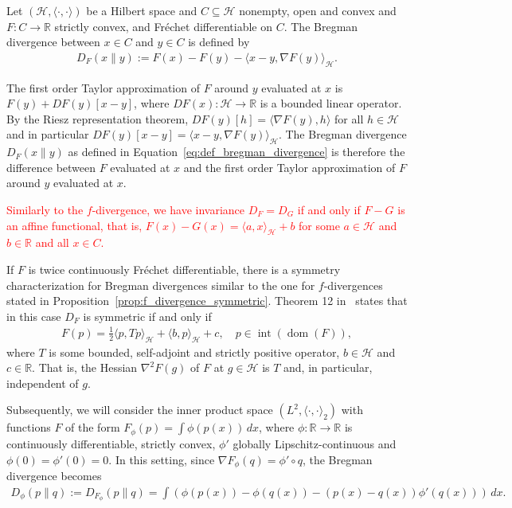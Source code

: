 \begin{Def}
    Let $(\mathcal{H},\langle\cdot,\cdot\rangle)$ be a Hilbert space and $C\subseteq\mathcal{H}$ nonempty, open and convex and $F:C\to\mathbb{R}$ strictly convex, and Fréchet differentiable on $C$. The Bregman divergence between $x\in C$ and $y\in C$ is defined by
    \begin{align}\label{eq:def_bregman_divergence}
        D_F(x\|y):=F(x)-F(y)-\langle x-y,\nabla F(y)\rangle_{\mathcal{H}}.
    \end{align}
\end{Def}

The first order Taylor approximation of $F$ around $y$ evaluated at $x$ is $F(y)+DF(y)[x-y]$, where $DF(x):\mathcal{H}\to\mathbb{R}$ is a bounded linear operator. By the Riesz representation theorem, $DF(y)[h]=\langle\nabla F(y),h\rangle$ for all $h\in\mathcal{H}$ and in particular $DF(y)[x-y]=\langle x-y,\nabla F(y)\rangle_{\mathcal{H}}$. The Bregman divergence $D_F(x\|y)$ as defined in Equation~\eqref{eq:def_bregman_divergence} is therefore the difference between $F$ evaluated at $x$ and the first order Taylor approximation of $F$ around $y$ evaluated at $x$.


\textcolor{red}{Similarly to the $f$-divergence, we have invariance $D_F=D_{G}$ if and only if $F-G$ is an affine functional, that is, $F(x)-G(x)=\langle a,x\rangle_{\mathcal{H}}+b$ for some $a\in\mathcal{H}$ and $b\in\mathbb{R}$ and all $x\in C$.}

If $F$ is twice continuously Fréchet differentiable, there is a symmetry characterization for Bregman divergences similar to the one for $f$-divergences stated in Proposition~\ref{prop:f_divergence_symmetric}. Theorem 12 in~\cite{tsuchida_generalising_2026} states that in this case $D_F$ is symmetric if and only if
\begin{align}\label{eq:general_symmetry_characterization}
    F(p)=\frac{1}{2}\langle p,Tp\rangle_{\mathcal{H}}+\langle b,p\rangle_{\mathcal{H}} +c,\quad p\in\operatorname{int}(\operatorname{dom}(F)),
\end{align}
where $T$ is some bounded, self-adjoint and strictly positive operator, $b\in\mathcal{H}$ and $c\in\mathbb{R}$. That is, the Hessian $\nabla^2F(g)$ of $F$ at $g\in\mathcal{H}$ is $T$ and, in particular, independent of $g$.

Subsequently, we will consider the inner product space $(L^2,\langle\cdot,\cdot\rangle_2)$ with functions $F$ of the form $F_{\phi}(p)=\int\phi(p(x))\,dx$, where $\phi:\mathbb{R}\to\mathbb{R}$ is continuously differentiable, strictly convex, $\phi'$ globally Lipschitz-continuous and $\phi(0)=\phi'(0)=0$. In this setting, since $\nabla F_{\phi}(q)=\phi'\circ q$, the Bregman divergence becomes
\begin{align*}
    D_{\phi}(p\|q):=D_{F_{\phi}}(p\|q)=\int\left(\phi(p(x))-\phi(q(x))-(p(x)-q(x))\phi'(q(x))\right)\,dx.
\end{align*}

